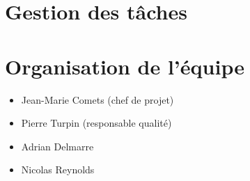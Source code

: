 \documentclass[11pt, a4paper]{article}
\begin{document}
\section{Gestion des tâches}

\section{Organisation de l’équipe}
\begin{itemize}
  \item Jean-Marie Comets (chef de projet)
  \item Pierre Turpin (responsable qualité)
  \item Adrian Delmarre
  \item Nicolas Reynolds
\end{itemize}
\end{document}
